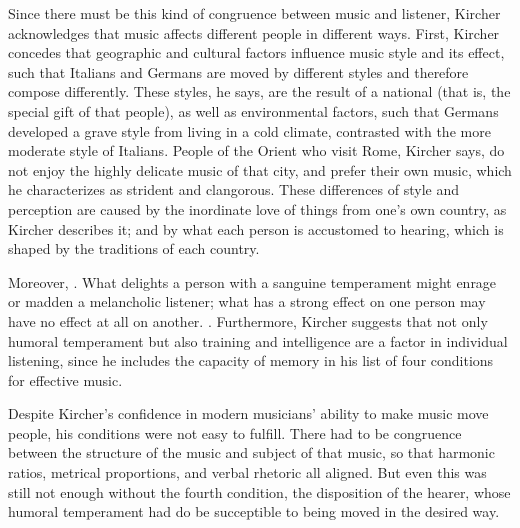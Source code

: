Since there must be this kind of congruence between music and listener, Kircher
acknowledges that music affects different people in different ways.
First, Kircher concedes that geographic and cultural factors influence music
style and its effect, such that Italians and Germans are moved by different
styles and therefore compose differently.
These styles, he says, are the result of a national  (that is,
the special gift of that people), as well as environmental factors, such that
Germans developed a grave style from living in a cold climate, contrasted with
the more moderate style of Italians.
People of the Orient who visit Rome, Kircher says, do not enjoy the highly
delicate music of that city, and prefer their own music, which he characterizes
as strident and clangorous.
These differences of style and perception are caused by the inordinate love of
things from one's own country, as Kircher describes it; and by what each person
is accustomed to hearing, which is shaped by the traditions of each country.%
    \Autocites[543--544]{Kircher:Musurgia}

Moreover, .%
    \Autocite[544]{Kircher:Musurgia}
What delights a person with a sanguine temperament might enrage or madden a
melancholic listener; what has a strong effect on one person may have no effect
at all on another.
.%
    \Autocite[550]{Kircher:Musurgia}
Furthermore, Kircher suggests that not only humoral temperament but also
training and intelligence are a factor in individual listening, since he
includes the capacity of memory in his list of four conditions for effective
music.


Despite Kircher's confidence in modern musicians' ability to make music move
people, his conditions were not easy to fulfill.
There had to be congruence between the structure of the music and subject of
that music, so that harmonic ratios, metrical proportions, and verbal rhetoric
all aligned.
But even this was still not enough without the fourth condition, the
disposition of the hearer, whose humoral temperament had do be succeptible to
being moved in the desired way.

